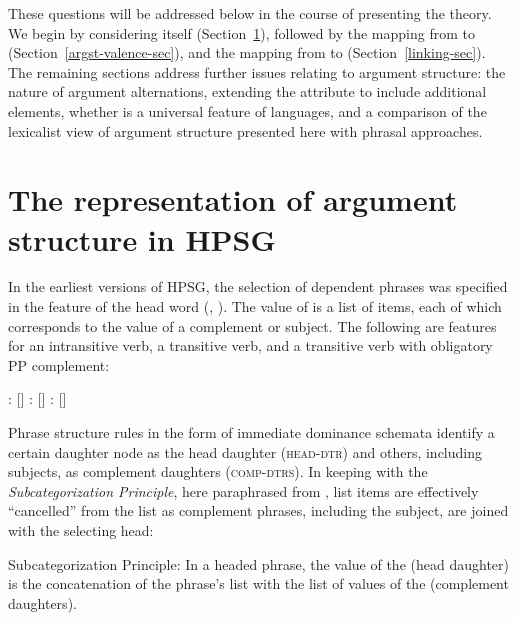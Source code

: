 \documentclass[output=paper
 	        ,biblatex
                ,babelshorthands
                ,newtxmath
                ,draftmode
                ,colorlinks, citecolor=brown
]{langscibook}
\begin{document}
\noindent
These questions will be addressed below in the course of presenting the theory.  We begin by
considering \argst itself (Section~\ref{sec:arg-st}), followed by the mapping from \argst to
 (Section~\ref{argst-valence-sec}), and the mapping from \content to \argst
(Section~\ref{linking-sec}). The remaining sections
address further issues relating to argument structure: the nature of argument alternations,
extending the \argst attribute to include additional elements, whether \argst is a universal feature
of languages, and a comparison of the lexicalist view of argument structure presented here with
phrasal approaches. 


\section{The representation of argument structure in HPSG}

\label{sec:arg-st}

In the earliest versions of HPSG, the selection of dependent phrases was specified in the \subcat feature of the head word (\citealt{pollard+sag:1987}, \citealt[Chapters~1--8]{pollard+sag:1994}).  The value of \subcat is a list of items, each of which corresponds to the \synsem value of a complement or subject.  The following are \subcat features for an intransitive verb, a transitive verb, and a transitive verb with obligatory PP complement:


\begin{exe} 
\ex \label{subcats}
\begin{xlist}
\ex {}: $[$\subcat {}$]$
\ex {}:   $[$\subcat {}$]$
\ex {}:   $[$\subcat {}$]$
\end{xlist}
\end{exe}

\noindent
Phrase structure rules in the form of immediate dominance schemata
identify a certain daughter node as the head daughter (\textsc{head-dtr}) and others, including
subjects, as complement daughters (\textsc{comp-dtrs}).  In keeping with the \emph{Subcategorization
  Principle}, here paraphrased from ,
list items are effectively ``cancelled'' from the \subcat list as complement phrases, including the
subject, are joined with the selecting head:

\begin{exe}
\ex Subcategorization Principle: In a headed phrase, the \subcat value of the \headdtr (head daughter) is the concatenation of the phrase's \subcat list with the list of \synsem values of the \compsdtrs (complement daughters).
\end{exe}
\end{document}
